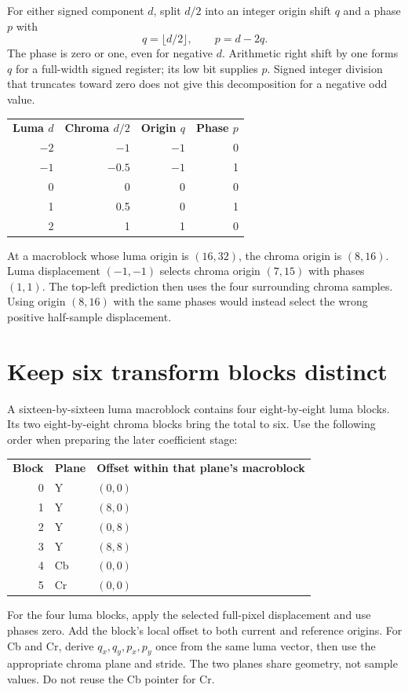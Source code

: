 For either signed component $d$, split $d/2$ into an integer origin shift $q$ and
a phase $p$ with
\[
q=\lfloor d/2\rfloor,\qquad p=d-2q.
\]
The phase is zero or one, even for negative $d$. Arithmetic right shift by one
forms $q$ for a full-width signed register; its low bit supplies $p$. Signed
integer division that truncates toward zero does not give this decomposition
for a negative odd value.
\begin{center}
\begin{tabular}{rrrr}
\textbf{Luma $d$} & \textbf{Chroma $d/2$} & \textbf{Origin $q$} & \textbf{Phase $p$}\\
$-2$ & $-1$ & $-1$ & 0\\
$-1$ & $-0.5$ & $-1$ & 1\\
0 & 0 & 0 & 0\\
1 & 0.5 & 0 & 1\\
2 & 1 & 1 & 0
\end{tabular}
\end{center}
At a macroblock whose luma origin is $(16,32)$, the chroma origin is $(8,16)$.
Luma displacement $(-1,-1)$ selects chroma origin $(7,15)$ with phases $(1,1)$.
The top-left prediction then uses the four surrounding chroma samples. Using
origin $(8,16)$ with the same phases would instead select the wrong positive
half-sample displacement.

\section{Keep six transform blocks distinct}
A sixteen-by-sixteen luma macroblock contains four eight-by-eight luma blocks.
Its two eight-by-eight chroma blocks bring the total to six. Use the following
order when preparing the later coefficient stage:
\begin{center}
\begin{tabular}{rll}
\textbf{Block} & \textbf{Plane} & \textbf{Offset within that plane's macroblock}\\
0 & Y & $(0,0)$\\
1 & Y & $(8,0)$\\
2 & Y & $(0,8)$\\
3 & Y & $(8,8)$\\
4 & Cb & $(0,0)$\\
5 & Cr & $(0,0)$
\end{tabular}
\end{center}
For the four luma blocks, apply the selected full-pixel displacement and use
phases zero. Add the block's local offset to both current and reference origins.
For Cb and Cr, derive $q_x,q_y,p_x,p_y$ once from the same luma vector, then use
the appropriate chroma plane and stride. The two planes share geometry, not sample
values. Do not reuse the Cb pointer for Cr.

